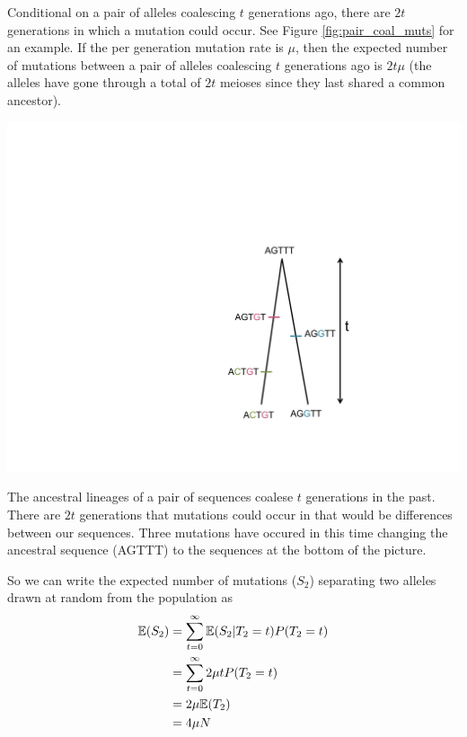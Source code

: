 Conditional on a pair of alleles coalescing $t$ generations ago,
there are $2t$ generations in which a mutation could occur. See Figure \ref{fig:pair_coal_muts} for an example. If the per
generation mutation rate is $\mu$, then the expected number of
mutations between a pair of alleles coalescing $t$ generations ago is
$2 t\mu$ (the alleles have gone through a total of $2t$ meioses since they last shared a common ancestor).
\begin{marginfigure}
\begin{center}
  \includegraphics[width =
  \textwidth]{figures/Coalescent/Coal_two_lineages_muts.pdf}  \end{center}
\caption{The ancestral lineages of a pair of sequences coalese $t$ generations in the past. There are $2t$ generations that mutations could occur in that would be differences between our sequences. Three mutations have occured in this time changing the ancestral sequence (AGTTT) to the sequences at the bottom of the picture. } \label{fig:pair_coal_muts}
\end{marginfigure}
So we can write the expected
number of mutations ($S_2$) separating two alleles drawn at random from the
population as %
\begin{align}
\mathbb{E}(S_2) &= \sum_{t=0}^{\infty} \mathbb{E}(S_2 | T_2=t) P(T_2=t) \nonumber\\
& =\sum_{t=0}^{\infty} 2 \mu t P(T_2=t) \nonumber\\
& =2\mu \mathbb{E}(T_2)  \nonumber\\
& = 4 \mu N
\end{align}
